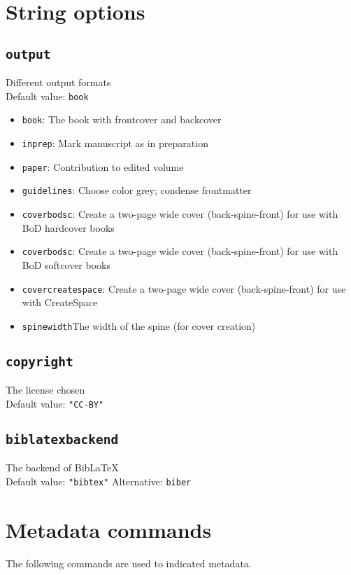 \documentclass[%
output=guidelines,
guidelines]{langscibook}
\newcommand{\option}[3]{\subsection{\texttt{#1}}{#2}\\Default value: {\texttt{#3}}}
\begin{document}
\section{String options} 
\option{output}{Different output formats}{book}
\begin{itemize}
\item \texttt{book}: The book with frontcover and backcover 
\item \texttt{inprep}: Mark manuscript as in preparation
\item \texttt{paper}: Contribution to edited volume
\item \texttt{guidelines}: Choose color grey; condense frontmatter
\item \texttt{coverbodsc}: Create a two-page wide cover  (back-spine-front) for use with BoD hardcover books
\item \texttt{coverbodsc}: Create a two-page wide cover  (back-spine-front) for use with BoD softcover books
\item \texttt{covercreatespace}: Create a two-page wide cover  (back-spine-front) for use with CreateSpace 
\item \texttt{spinewidth}{The width of the spine (for cover creation)}
\end{itemize}
\option{copyright}{The license chosen}{"CC-BY"}
\option{biblatexbackend}{The backend of BibLaTeX}{"bibtex"}
Alternative: \texttt{biber}




\section{Metadata commands}\label{sec:metadatacommands}
The following commands are used to indicated metadata.  
\end{document}
